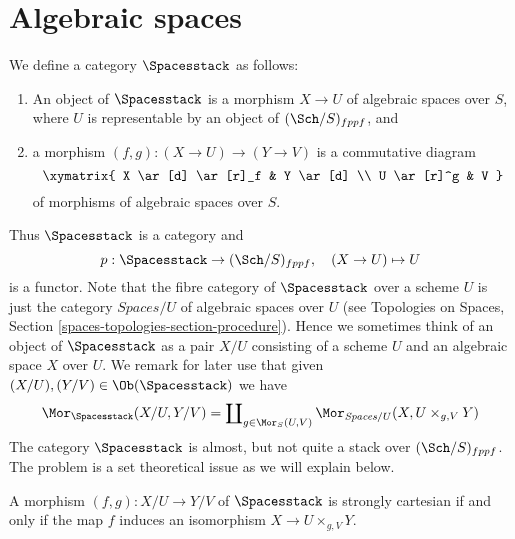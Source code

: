 \section{Algebraic spaces}
\label{section-stack-of-spaces}

\noindent
We define a category $\Spacesstack$ as follows:
\begin{enumerate}
\item An object of $\Spacesstack$ is a morphism $X \to U$
of algebraic spaces over $S$, where $U$ is representable by an object of
$(\Sch/S)_{fppf}$, and
\item a morphism $(f, g) : (X \to U) \to (Y \to V)$
is a commutative diagram
$$
\xymatrix{
X \ar[d] \ar[r]_f & Y \ar[d] \\
U \ar[r]^g & V
}
$$
of morphisms of algebraic spaces over $S$.
\end{enumerate}
Thus $\Spacesstack$ is a category and
$$
p : \Spacesstack \to (\Sch/S)_{fppf},
\quad
(X \to U) \mapsto U
$$
is a functor. Note that the fibre category of $\Spacesstack$ over
a scheme $U$ is just the category $\textit{Spaces}/U$ of
algebraic spaces over $U$ (see
Topologies on Spaces, Section \ref{spaces-topologies-section-procedure}).
Hence we sometimes think of an object of $\Spacesstack$ as a
pair $X/U$ consisting of a scheme $U$ and an algebraic space $X$ over $U$.
We remark for later use that given
$(X/U), (Y/V) \in \Ob(\Spacesstack)$
we have
\begin{equation}
\label{equation-morphisms-spaces}
\Mor_{\Spacesstack}(X/U, Y/V)
=
\coprod\nolimits_{g \in \Mor_S(U, V)}
\Mor_{\textit{Spaces}/U}(X, U \times_{g, V} Y)
\end{equation}
The category $\Spacesstack$ is almost, but not quite a stack
over $(\Sch/S)_{fppf}$. The problem is a set theoretical
issue as we will explain below.

\begin{lemma}
\label{lemma-spaces-strongly-cartesian}
A morphism $(f, g) : X/U \to Y/V$
of $\Spacesstack$ is strongly cartesian if and only if the
map $f$ induces an isomorphism $X \to U \times_{g, V} Y$.
\end{lemma}

